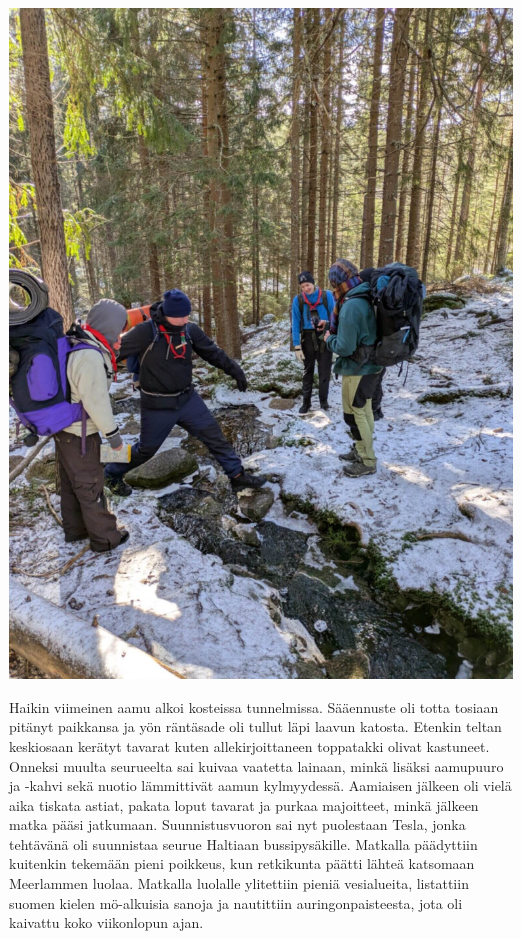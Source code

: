 \begin{multicols}{2}
\vfill*
\columnbreak

\begin{center}
\noindent\includegraphics[width=1.0\linewidth,trim={0 0 0 0},clip]{assets/minihaikki5}
\end{center}

Haikin viimeinen aamu alkoi kosteissa tunnelmissa. Sääennuste oli totta tosiaan
pitänyt paikkansa ja yön räntäsade oli tullut läpi laavun katosta. Etenkin
teltan keskiosaan kerätyt tavarat kuten allekirjoittaneen toppatakki olivat
kastuneet. Onneksi muulta seurueelta sai kuivaa vaatetta lainaan, minkä lisäksi
aamupuuro ja -kahvi sekä nuotio lämmittivät aamun kylmyydessä. Aamiaisen
jälkeen oli vielä aika tiskata astiat, pakata loput tavarat ja purkaa
majoitteet, minkä jälkeen matka pääsi jatkumaan. Suunnistusvuoron sai nyt
puolestaan Tesla, jonka tehtävänä oli suunnistaa seurue Haltiaan
bussipysäkille. Matkalla päädyttiin kuitenkin tekemään pieni poikkeus, kun
retkikunta päätti lähteä katsomaan Meerlammen luolaa. Matkalla luolalle
ylitettiin pieniä vesialueita, listattiin suomen kielen mö-alkuisia sanoja ja
nautittiin auringonpaisteesta, jota oli kaivattu koko viikonlopun ajan.


\end{multicols}
